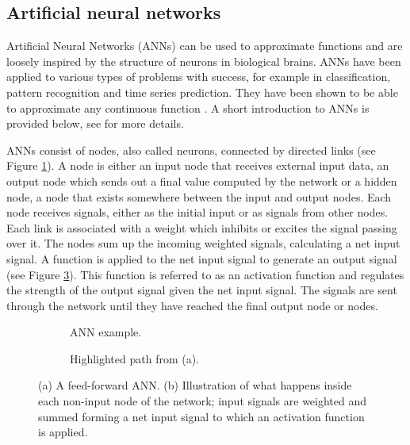 \subsection{Artificial neural networks}
Artificial Neural Networks (ANNs) can be used to approximate functions and are loosely inspired by the structure
of neurons in biological brains. ANNs have been applied to various types of problems with success, for example
in classification, pattern recognition and time series prediction. 
They have been shown to be able to approximate any continuous function \cite{universality_formal}.
A short introduction to ANNs is provided below, see \cite{compint} for more details.

ANNs consist of nodes, also called neurons, connected by directed links (see Figure \ref{feedforward}).
A node is either an input node that receives external input data, an output node which sends out a final value computed
by the network or a hidden node, a node that exists somewhere between the input and output nodes. Each node receives signals, either
as the initial input or as signals from other nodes. Each link is associated with a weight which inhibits or excites the signal
passing over it. The nodes sum up the incoming weighted signals, calculating a net input signal. A function is applied to the net input
signal to generate an output signal (see Figure \ref{neuron}). This function is referred to as an activation function and regulates the strength of the output
signal given the net input signal. The signals are sent through the network until they have reached the final output node or nodes.


\begin{figure}[htb]
    \begin{mdframed}
        \begin{subfigure}[b]{0.5\textwidth}
            \centering
            \resizebox{0.7\textwidth}{!}{}
            \caption{ANN example.}
            \label{feedforward}
        \end{subfigure}
        \begin{subfigure}[b]{0.5\textwidth}
            \centering
            \resizebox{0.9\textwidth}{!}{}
            \caption{Highlighted path from (a).}
            \label{neuron}
        \end{subfigure}
    \end{mdframed}
    \caption{(a) A feed-forward ANN. (b) Illustration of what happens inside each non-input node of the network; input
                 signals are weighted and summed forming a net input signal to which an activation function is applied.}
\end{figure}

